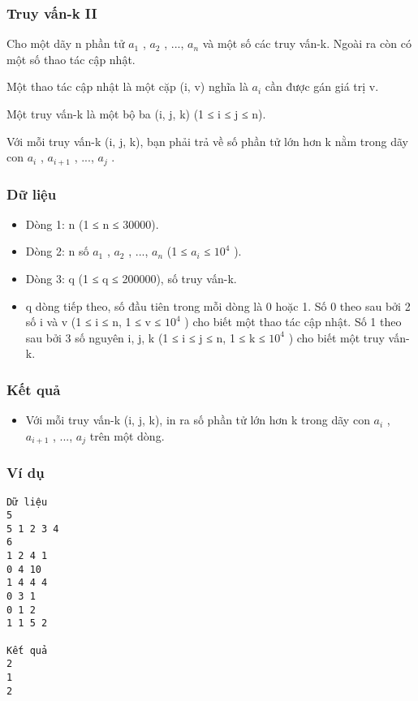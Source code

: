 



\subsubsection{   Truy vấn-k II  }

   Cho một dãy n phần tử $a_{1}$   ,   $a_{2}$   , ..., $a_{n}$   và một số các truy vấn-k. Ngoài ra còn có một số thao tác cập nhật.  

   Một thao tác cập nhật là một cặp (i, v) nghĩa là $a_{i}$   cần được gán giá trị v.  

   Một truy vấn-k là một bộ ba (i, j, k) (1 ≤ i ≤ j ≤ n).  

   Với mỗi truy vấn-k (i, j, k), bạn phải trả về số phần tử lớn hơn k nằm trong dãy con $a_{i}$   ,   $a_{i+1}$   , ..., $a_{j}$   .  

\subsubsection{   Dữ liệu  }
\begin{itemize}
	\item     Dòng 1: n (1 ≤ n ≤ 30000).   
	\item     Dòng 2: n số $a_{1}$    , $a_{2}$    , ...,   $a_{n}$    (1 ≤ $a_{i}$    ≤   $10^{4}$    ).   
	\item     Dòng 3: q (1 ≤ q ≤ 200000), số truy vấn-k.   
	\item     q dòng tiếp theo, số đầu tiên trong mỗi dòng là 0 hoặc 1. Số 0 theo sau bởi 2 số i và v (1 ≤ i ≤ n, 1 ≤ v ≤ $10^{4}$    ) cho biết một thao tác cập nhật. Số 1 theo sau bởi 3 số nguyên i, j, k (1 ≤ i ≤ j ≤ n, 1 ≤ k ≤ $10^{4}$    ) cho biết một truy vấn-k.   
\end{itemize}

\subsubsection{   Kết quả  }
\begin{itemize}
	\item     Với mỗi truy vấn-k (i, j, k), in ra số phần tử lớn hơn k trong dãy con $a_{i}$    ,   $a_{i+1}$    , ..., $a_{j}$    trên một dòng.    


\end{itemize}

\subsubsection{   Ví dụ  }
\begin{verbatim}
Dữ liệu
5
5 1 2 3 4
6
1 2 4 1
0 4 10
1 4 4 4
0 3 1
0 1 2
1 1 5 2  

Kết quả
2
1
2 
\end{verbatim}
